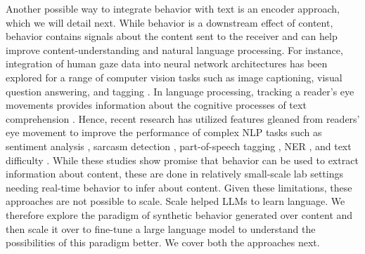 Another possible way to integrate behavior with text is an encoder approach, which we will detail next. While behavior is a downstream effect of content, behavior contains signals about the content sent to the receiver and can help improve content-understanding and natural language processing. For instance,  integration of human gaze data into neural network architectures has been explored for a range of computer vision tasks such as image captioning, visual question answering, and tagging \cite{karessli2017gaze,yu2017supervising,he2019human,boyd2022human}. In language processing, tracking a reader's eye movements provides information about the cognitive processes of text comprehension \cite{RaynerReadingComp, Just1980}. Hence, recent research has utilized features gleaned from readers' eye movement to improve the performance of complex NLP tasks such as sentiment analysis \cite{long-etal-2017-cognition, mishra-etal-2016-leveraging}, sarcasm detection \cite{mishra-etal-2016-harnessing}, part-of-speech tagging \cite{barrett-etal-2016-cross}, NER \cite{hollenstein-zhang-2019-entity}, and text difficulty \cite{ScanPathApp1}. While these studies show promise that behavior can be used to extract information about content, these are done in relatively small-scale lab settings needing real-time behavior to infer about content. Given these limitations, these approaches are not possible to scale. Scale helped LLMs to learn language. We therefore explore the paradigm of synthetic behavior generated over content and then scale it over to fine-tune a large language model to understand the possibilities of this paradigm better. We cover both the approaches next.






